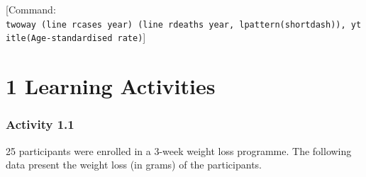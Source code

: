\documentclass[
]{memoir}
\begin{document}
{[}Command: \texttt{twoway\ (line\ rcases\ year)\ (line\ rdeaths\ year,\ lpattern(shortdash)),\ ytitle(Age-standardised\ rate)}{]}

\hypertarget{learning-activities}{%
\chapter*{\texorpdfstring{\textbf{1} Learning Activities}{1 Learning Activities}}\label{learning-activities}}

\hypertarget{activity-1.1}{%
\subsection*{Activity 1.1}\label{activity-1.1}}

25 participants were enrolled in a 3-week weight loss programme. The following data present the weight loss (in grams) of the participants.

 
  \providecommand{\huxb}[2]{\arrayrulecolor[RGB]{#1}\global\arrayrulewidth=#2pt}
  \providecommand{\huxvb}[2]{\color[RGB]{#1}\vrule width #2pt}
  \providecommand{\huxtpad}[1]{\rule{0pt}{#1}}
  \providecommand{\huxbpad}[1]{\rule[-#1]{0pt}{#1}}
\end{document}
